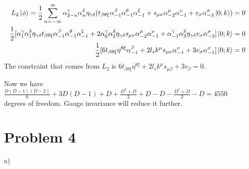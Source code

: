 \documentclass[12pt]{article}
\begin{document}
\begin{equation}
\begin{aligned}[t]
L_2\ket{\phi}=\frac{1}{2}\sum\limits_{n=-\infty}^\infty \alpha_{2-n}^\gamma\alpha_n^\delta\eta_{\gamma\delta}(t_{\beta\theta\xi}\alpha_{-1}^\beta\alpha_{-1}^\theta\alpha_{-1}^\xi+s_{\mu\nu}\alpha_{-2}^\mu\alpha_{-1}^\nu+v_\sigma\alpha_{-3}^\sigma\ket{0;k})=0\\
\frac{1}{2}[\alpha_{1}^\gamma\alpha_1^\delta\eta_{\gamma\delta}t_{\beta\theta\xi}\alpha_{-1}^\beta\alpha_{-1}^\theta\alpha_{-1}^\xi+2\alpha_{0}^\gamma\alpha_2^\delta\eta_{\gamma\delta}s_{\mu\nu}\alpha_{-2}^\mu\alpha_{-1}^\nu+\alpha_{-1}^\gamma\alpha_3^\delta\eta_{\gamma\delta}v_\sigma\alpha_{-3}^\sigma]\ket{0;k}=0\\
\frac{1}{2}[6t_{\beta\theta\xi}\eta^{\theta\xi}\alpha_{-1}^\beta+2l_s k^\mu s_{\mu\nu}\alpha_{-1}^\nu+3v_\sigma\alpha_{-1}^\sigma]\ket{0;k}=0
\end{aligned}
\end{equation}
The constraint that comes from $L_2$ is $6t_{\beta\theta\xi}\eta^{\theta\xi}+2l_s k^\mu s_{\mu\beta}+3v_\beta=0$.

Now we have $\frac{D(D-1)(D-2)}{6}+3D(D-1)+D+\frac{D^2+D}{2}+D-D-\frac{D^2+D}{2}-D=4550$ degrees of freedom. Gauge invariance will reduce it further.
\section{Problem 4}
\begin{paragraph}{a)}

\end{paragraph}
\end{document}
